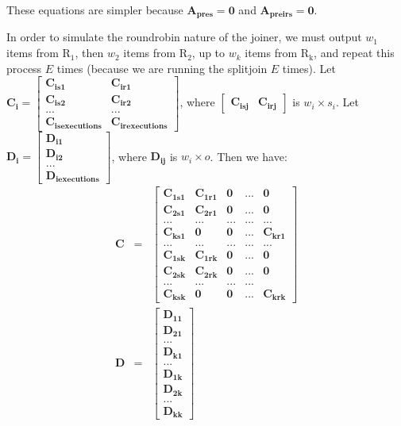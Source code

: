     These equations are simpler because $\mathbf{A_{pres}} =
\mathbf{0}$ and $\mathbf{A_{preirs}} = \mathbf{0}$.

    In order to simulate the roundrobin nature of the joiner,
we must output $w_1$ items from $\mathrm{R_1}$, then $w_2$ items
from $\mathrm{R_2}$, up to $w_k$ items from $\mathrm{R_k}$, and
repeat this process $E$ times (because we are running the
splitjoin $E$ times). Let $\mathbf{C_i} = \left [
\begin{array} {cc} \mathbf{C_{is1}} & \mathbf{C_{ir1}} \\
\mathbf{C_{is2}} & \mathbf{C_{ir2}} \\ ... & ... \\
\mathbf{C_{isexecutions}} & \mathbf{C_{irexecutions}} \end{array}
\right ]$, where $\left [ \begin{array} {cc} \mathbf{C_{isj}} &
\mathbf{C_{irj}} \end{array} \right ]$ is $w_i \times s_i$. Let
$\mathbf{D_i} = \left [
\begin{array} {c} \mathbf{D_{i1}} \\ \mathbf{D_{i2}} \\ ... \\
\mathbf{D_{iexecutions}} \end{array} \right ]$, where
$\mathbf{D_{ij}}$ is $w_i \times o$. Then we have:
\begin{eqnarray*}
\mathbf{C} & = & \left [ \begin{array} {ccccc} \mathbf{C_{1s1}} &
\mathbf{C_{1r1}} & \mathbf{0} & ... & \mathbf{0} \\
\mathbf{C_{2s1}} & \mathbf{C_{2r1}} & \mathbf{0} & ... &
\mathbf{0} \\ ... & ... & ... & ... & ... \\ \mathbf{C_{ks1}} &
\mathbf{0} & \mathbf{0} & ... & \mathbf{C_{kr1}} \\ ... & ... & ... & ... & ... \\
\mathbf{C_{1sk}} & \mathbf{C_{1rk}} & \mathbf{0} & ... & \mathbf{0} \\
\mathbf{C_{2sk}} & \mathbf{C_{2rk}} & \mathbf{0} & ... & \mathbf{0} \\
... & ... & ... & ... \\ \mathbf{C_{ksk}} & \mathbf{0} & \mathbf{0} & ... & \mathbf{C_{krk}}
\end{array} \right ] \\
\mathbf{D} & = & \left [ \begin{array} {c} \mathbf{D_{11}} \\
\mathbf{D_{21}} \\ ... \\ \mathbf{D_{k1}} \\ ... \\ \mathbf{D_{1k}} \\
\mathbf{D_{2k}} \\ ... \\ \mathbf{D_{kk}} \end{array} \right ]
\end{eqnarray*}

